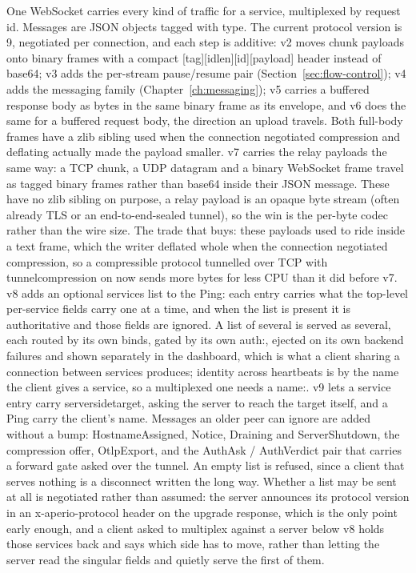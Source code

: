 \documentclass[11pt,a4paper,oneside]{book}
\newcommand{\aperiobreakableunderscore}{\textunderscore\allowbreak}
\newcommand{\aperiocodebreaks}{\XeTeXinterchartokenstate=1 }
\newcommand{\aperiocodebreaks}{}
\DeclareRobustCommand{\code}[1]{{\ttfamily\small\aperiocodebreaks
  \let\_\aperiobreakableunderscore#1}}
\begin{document}
One WebSocket carries every kind of traffic for a service, multiplexed by
request id. Messages are JSON objects tagged with \code{type}. The
current protocol version is 9, negotiated per connection, and each step
is additive: v2 moves chunk payloads onto binary frames with a compact
\code{[tag][id\_len][id][payload]} header instead of base64; v3 adds the
per-stream pause/resume pair (Section~\ref{sec:flow-control}); v4 adds
the messaging family (Chapter~\ref{ch:messaging}); v5 carries a buffered
response body as bytes in the same binary frame as its envelope, and v6
does the same for a buffered request body, the direction an upload
travels. Both full-body frames have a zlib sibling used when the
connection negotiated compression and deflating actually made the
payload smaller. v7 carries the relay payloads the same way: a TCP
chunk, a UDP datagram and a binary WebSocket frame travel as tagged
binary frames rather than base64 inside their JSON message. These have
no zlib sibling on purpose, a relay payload is an opaque byte stream
(often already TLS or an end-to-end-sealed tunnel), so the win is the
per-byte codec rather than the wire size. The trade that buys: these
payloads used to ride inside a text frame, which the writer deflated
whole when the connection negotiated compression, so a compressible
protocol tunnelled over TCP with \code{tunnel\_compression} on now
sends more bytes for less CPU than it did before v7. v8 adds an
optional \code{services} list to the Ping: each entry carries what the
top-level per-service fields carry one at a time, and when the list is
present it is authoritative and those fields are ignored. A list of
several is served as several, each routed by its own binds, gated by
its own \code{auth:}, ejected on its own backend failures and shown
separately in the dashboard, which is what a client sharing a connection
between services produces; identity across heartbeats is by the name the
client gives a service, so a multiplexed one needs a \code{name:}. v9 lets a service entry carry \code{server\_side\_target},
asking the server to reach the target itself, and a Ping carry the client's
\code{name}. Messages an older peer can ignore are added without a bump:
\code{HostnameAssigned}, \code{Notice}, \code{Draining} and
\code{ServerShutdown}, the compression offer, \code{OtlpExport}, and the \code{AuthAsk} /
\code{AuthVerdict} pair that carries a \code{forward} gate asked over
the tunnel. An
empty list is refused, since a client that serves nothing is a
disconnect written the long way. Whether a list may be sent at all is
negotiated rather than assumed: the server announces its protocol
version in an \code{x-aperio-protocol} header on the upgrade response,
which is the only point early enough, and a client asked to multiplex
against a server below v8 holds those services back and says which
side has to move, rather than letting the server read the singular
fields and quietly serve the first of them.
\end{document}
